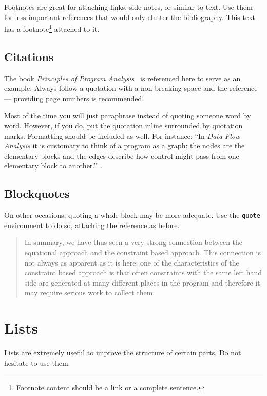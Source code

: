 Footnotes are great for attaching links, side notes, or similar to text.
Use them for less important references that would only clutter the bibliography.
This text has a footnote\footnote{Footnote content should be a link or a complete sentence.} attached to it.

\subsection{Citations}

The book \emph{Principles of Program Analysis}~\cite{Nielson:ppa} is referenced here to serve as an example.
Always follow a quotation with a non-breaking space and the reference --- providing page numbers is recommended.

Most of the time you will just paraphrase instead of quoting someone word by word.
However, if you do, put the quotation inline surrounded by quotation marks.
Formatting should be included as well.
For instance: ``In \emph{Data Flow Analysis} it is customary to think of a program as a graph: the nodes are the elementary blocks and the edges describe how control might pass from one elementary block to another.''~\cite[p.~5]{Nielson:ppa}.

\subsection{Blockquotes}

On other occasions, quoting a whole block may be more adequate.
Use the \texttt{quote} environment to do so, attaching the reference as before.

\begin{quote}
	In summary, we have thus seen a very strong connection between the equational approach and the constraint based approach.
	This connection is not always as apparent as it is here: one of the characteristics of the constraint based approach is that often constraints with the same left hand side are generated at many different places in the program and therefore it may require serious work to collect them.~\cite[p.~10]{Nielson:ppa}
\end{quote}

\section{Lists}

Lists are extremely useful to improve the structure of certain parts.
Do not hesitate to use them.

